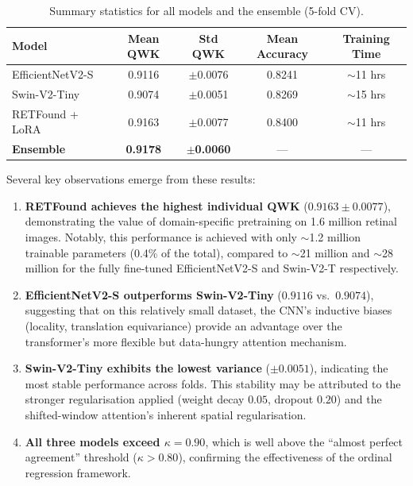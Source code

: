 \begin{table}[htbp]
\centering
\caption{Summary statistics for all models and the ensemble (5-fold CV).}
\label{tab:summary_stats}
\begin{tabular}{lcccc}
\toprule
\textbf{Model} & \textbf{Mean QWK} & \textbf{Std QWK} & \textbf{Mean Accuracy} & \textbf{Training Time} \\
\midrule
EfficientNetV2-S    & 0.9116 & $\pm$0.0076 & 0.8241 & $\sim$11 hrs \\
Swin-V2-Tiny        & 0.9074 & $\pm$0.0051 & 0.8269 & $\sim$15 hrs \\
RETFound + LoRA     & 0.9163 & $\pm$0.0077 & 0.8400 & $\sim$11 hrs \\
\midrule
\textbf{Ensemble}   & \textbf{0.9178} & $\pm$\textbf{0.0060} & --- & --- \\
\bottomrule
\end{tabular}
\end{table}

Several key observations emerge from these results:

\begin{enumerate}
    \item \textbf{RETFound achieves the highest individual QWK} ($0.9163 \pm 0.0077$), demonstrating the value of domain-specific pretraining on 1.6 million retinal images. Notably, this performance is achieved with only $\sim$1.2 million trainable parameters (0.4\% of the total), compared to $\sim$21 million and $\sim$28 million for the fully fine-tuned EfficientNetV2-S and Swin-V2-T respectively.
    
    \item \textbf{EfficientNetV2-S outperforms Swin-V2-Tiny} ($0.9116$ vs.\ $0.9074$), suggesting that on this relatively small dataset, the CNN's inductive biases (locality, translation equivariance) provide an advantage over the transformer's more flexible but data-hungry attention mechanism.
    
    \item \textbf{Swin-V2-Tiny exhibits the lowest variance} ($\pm 0.0051$), indicating the most stable performance across folds. This stability may be attributed to the stronger regularisation applied (weight decay $0.05$, dropout $0.20$) and the shifted-window attention's inherent spatial regularisation.
    
    \item \textbf{All three models exceed $\kappa = 0.90$}, which is well above the ``almost perfect agreement'' threshold ($\kappa > 0.80$), confirming the effectiveness of the ordinal regression framework.
\end{enumerate}

